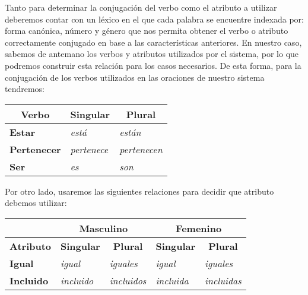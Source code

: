 Tanto para determinar la conjugación del verbo como el atributo a utilizar deberemos contar con un léxico en el que cada palabra se encuentre indexada por: forma canónica, número y género que nos permita obtener el verbo o atributo correctamente conjugado en base a las características anteriores. En nuestro caso, sabemos de antemano los verbos y atributos utilizados por el sistema, por lo que podremos construir esta relación para los casos necesarios. De esta forma, para la conjugación de los verbos utilizados en las oraciones de nuestro sistema tendremos:

\begin{table}[H]
\centering
\begin{tabular}{|l|l|l|}
\hline
\multicolumn{1}{|c|}{\textbf{Verbo}} & \multicolumn{1}{c|}{\textbf{Singular}} & \multicolumn{1}{c|}{\textbf{Plural}} \\ \hline
\textbf{Estar}                       & \textit{está}                                   & \textit{están}                                \\ \hline
\textbf{Pertenecer}                  & \textit{pertenece}                              & \textit{pertenecen}                           \\ \hline
\textbf{Ser}                         & \textit{es}                                     & \textit{son}                                  \\ \hline
\end{tabular}
\end{table}

\noindent
Por otro lado, usaremos las siguientes relaciones para decidir que atributo debemos utilizar:

\begin{table}[H]
\centering
\begin{tabular}{l|l|l|l|l|}
\cline{2-5}
                                 & \multicolumn{2}{c|}{\textbf{Masculino}}                                       & \multicolumn{2}{c|}{\textbf{Femenino}}                                        \\ \hline
\multicolumn{1}{|c|}{\textbf{Atributo}} & \multicolumn{1}{c|}{\textbf{Singular}} & \multicolumn{1}{c|}{\textbf{Plural}} & \multicolumn{1}{c|}{\textbf{Singular}} & \multicolumn{1}{c|}{\textbf{Plural}} \\ \hline
\multicolumn{1}{|l|}{\textbf{Igual}}    & \textit{igual}                                  & \textit{iguales}                              & \textit{igual}                                  & \textit{iguales}                              \\ \hline
\multicolumn{1}{|l|}{\textbf{Incluido}} & \textit{incluido}                               & \textit{incluidos}                            & \textit{incluida}                               & \textit{incluidas}                            \\ \hline
\end{tabular}
\end{table}

